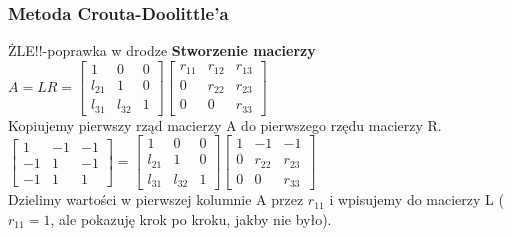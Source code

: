 \documentclass{article}
\begin{document}
\subsubsection{Metoda Crouta-Doolittle'a}
ŻLE!!-poprawka w drodze
\textbf{Stworzenie macierzy}\\
$A=LR=\begin{bmatrix} 1 & 0 & 0 \\ l_{21} & 1 & 0 \\ l_{31} & l_{32} & 1 \end{bmatrix} \begin{bmatrix} r_{11} & r_{12} & r_{13} \\ 0 & r_{22} & r_{23} \\ 0 & 0 & r_{33} \end{bmatrix}$\\
Kopiujemy pierwszy rząd macierzy A do pierwszego rzędu macierzy R.\\
$\begin{bmatrix} 1 & -1 & -1 \\ -1 & 1 & -1 \\ -1 & 1 & 1 \end{bmatrix}=\begin{bmatrix} 1 & 0 & 0 \\ l_{21} & 1 & 0 \\ l_{31} & l_{32} & 1 \end{bmatrix} \begin{bmatrix} 1 & -1 & -1 \\ 0 & r_{22} & r_{23} \\ 0 & 0 & r_{33} \end{bmatrix}$\\
Dzielimy wartości w pierwszej kolumnie A przez $r_{11}$ i wpisujemy do macierzy L ($r_{11}=1$, ale pokazuję krok po kroku, jakby nie było).\\
\end{document}
